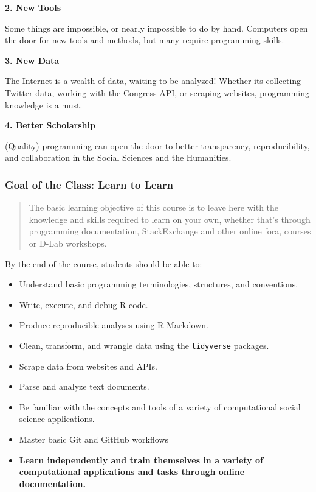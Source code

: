 \documentclass[]{book}
\providecommand{\tightlist}{%
  \setlength{\itemsep}{0pt}\setlength{\parskip}{0pt}}
\begin{document}
\textbf{2. New Tools}

Some things are impossible, or nearly impossible to do by hand. Computers open the door for new tools and methods, but many require programming skills.

\textbf{3. New Data}

The Internet is a wealth of data, waiting to be analyzed! Whether its collecting Twitter data, working with the Congress API, or scraping websites, programming knowledge is a must.

\textbf{4. Better Scholarship}

(Quality) programming can open the door to better transparency, reproducibility, and collaboration in the Social Sciences and the Humanities.

\hypertarget{goal-of-the-class-learn-to-learn}{%
\subsubsection*{Goal of the Class: Learn to Learn}\label{goal-of-the-class-learn-to-learn}}

\begin{quote}
The basic learning objective of this course is to leave here with the
knowledge and skills required to learn on your own, whether that's through
programming documentation, StackExchange and other online fora, courses or
D-Lab workshops.
\end{quote}

By the end of the course, students should be able to:

\begin{itemize}
\tightlist
\item
  Understand basic programming terminologies, structures, and conventions.
\item
  Write, execute, and debug R code.
\item
  Produce reproducible analyses using R Markdown.
\item
  Clean, transform, and wrangle data using the \texttt{tidyverse} packages.
\item
  Scrape data from websites and APIs.
\item
  Parse and analyze text documents.
\item
  Be familiar with the concepts and tools of a variety of computational social science applications.
\item
  Master basic Git and GitHub workflows
\item
  \textbf{Learn independently and train themselves in a variety of computational applications and tasks through online documentation.}
\end{itemize}
\end{document}
